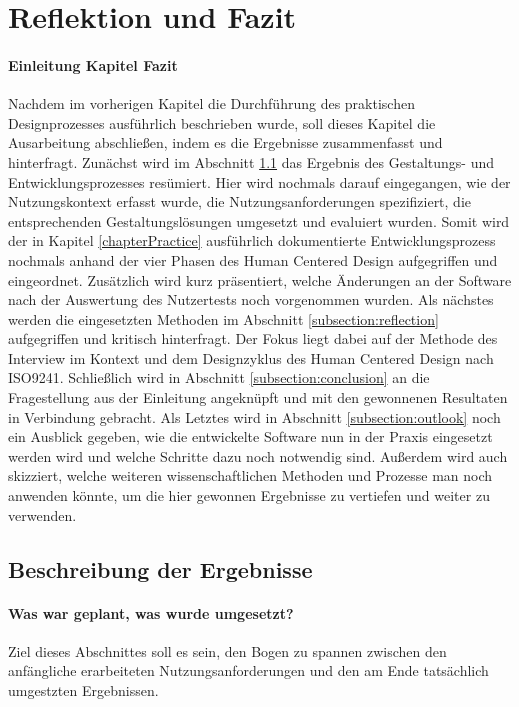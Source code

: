 \section{Reflektion und Fazit}
\paragraph{Einleitung Kapitel Fazit}

Nachdem im vorherigen Kapitel die Durchführung des praktischen Designprozesses
ausführlich beschrieben wurde, soll dieses Kapitel die Ausarbeitung
abschließen, indem es die Ergebnisse zusammenfasst und hinterfragt. Zunächst
wird im Abschnitt \ref{subsection:resultDescription} das Ergebnis des
Gestaltungs- und Entwicklungsprozesses resümiert. Hier wird nochmals darauf
eingegangen, wie der Nutzungskontext erfasst wurde, die Nutzungsanforderungen
spezifiziert, die entsprechenden Gestaltungslösungen umgesetzt und evaluiert
wurden. Somit wird der in Kapitel \ref{chapterPractice} ausführlich
dokumentierte Entwicklungsprozess nochmals anhand der vier Phasen des Human
Centered Design aufgegriffen und eingeordnet\cite{iso9241}. Zusätzlich wird
kurz präsentiert, welche Änderungen an der Software nach der Auswertung des
Nutzertests noch vorgenommen wurden. Als nächstes werden die eingesetzten
Methoden im Abschnitt \ref{subsection:reflection} aufgegriffen und kritisch
hinterfragt. Der Fokus liegt dabei auf der Methode des Interview im Kontext und
dem Designzyklus des Human Centered Design nach ISO9241. Schließlich wird in
Abschnitt \ref{subsection:conclusion} an die Fragestellung aus der Einleitung
angeknüpft und mit den gewonnenen Resultaten in Verbindung gebracht. Als
Letztes wird in Abschnitt \ref{subsection:outlook} noch ein Ausblick gegeben,
wie die entwickelte Software nun in der Praxis eingesetzt werden wird und
welche Schritte dazu noch notwendig sind. Außerdem wird auch skizziert, welche
weiteren wissenschaftlichen Methoden und Prozesse man noch anwenden könnte, um
die hier gewonnen Ergebnisse zu vertiefen und weiter zu verwenden.

\subsection{Beschreibung der Ergebnisse}
\label{subsection:resultDescription}

\paragraph{Was war geplant, was wurde umgesetzt?}
Ziel dieses Abschnittes soll es sein, den Bogen zu spannen zwischen den
anfängliche erarbeiteten Nutzungsanforderungen und den am Ende tatsächlich
umgestzten Ergebnissen.

